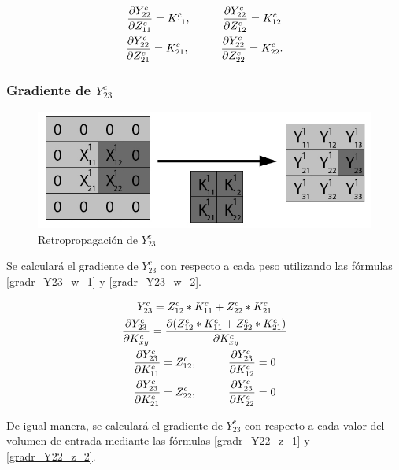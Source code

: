 \begin{gather}
	\frac{\partial Y^c_{22}}{\partial Z^c_{11}} = K^c_{11}, \hspace{10mm} \frac{\partial Y^c_{22}}{\partial Z^c_{12}} = K^c_{12} \label{gradr_Y22_z_1} \\
	\frac{\partial Y^c_{22}}{\partial Z^c_{21}} = K^c_{21}, \hspace{10mm} \frac{\partial Y^c_{22}}{\partial Z^c_{22}} = K^c_{22} \label{gradr_Y22_z_2}.
\end{gather}

\subsubsection{Gradiente de $Y^c_{23}$}

\begin{figure}[H]
	\centering
	\includegraphics[width=0.8\linewidth]{imagenes/conv_back_padding_6.jpg} 
	\caption{Retropropagación de $Y^c_{23}$}
\end{figure}

Se calculará el gradiente de $Y^c_{23}$ con respecto a cada peso utilizando las fórmulas \ref{gradr_Y23_w_1} y \ref{gradr_Y23_w_2}.


\begin{gather}
	Y^c_{23} = Z^c_{12} * K^c_{11} + Z^c_{22} * K^c_{21} \\
	\frac{\partial Y^c_{23}}{\partial K^c_{xy}} = \frac{\partial (Z^c_{12} * K^c_{11} + Z^c_{22} * K^c_{21})}{\partial K^c_{xy}} \\
	\frac{\partial Y^c_{23}}{\partial K^c_{11}} = Z^c_{12}, \hspace{10mm} \frac{\partial Y^c_{23}}{\partial K^c_{12}} = 0 \label{gradr_Y23_w_1} \\
	\frac{\partial Y^c_{23}}{\partial K^c_{21}} = Z^c_{22}, \hspace{10mm} \frac{\partial Y^c_{23}}{\partial K^c_{22}} = 0 \label{gradr_Y23_w_2}
\end{gather}

De igual manera, se calculará el gradiente de $Y^c_{23}$ con respecto a cada valor del volumen de entrada mediante las fórmulas \ref{gradr_Y22_z_1} y \ref{gradr_Y22_z_2}.


